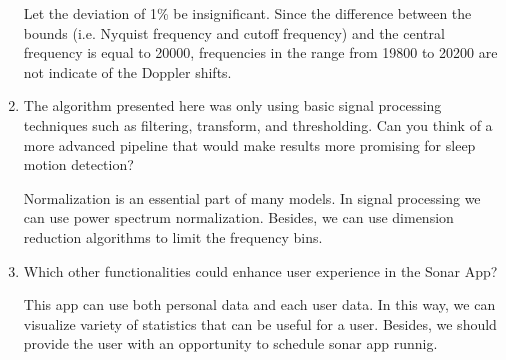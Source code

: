 \documentclass{homework}
\begin{document}
\begin{enumerate}
Let the deviation of 1\% be insignificant. Since the difference between the bounds (i.e. Nyquist frequency and cutoff frequency) and the central frequency is equal to 20000, frequencies in the range from 19800 to 20200 are not indicate of the Doppler shifts.
\newpage
\item The algorithm presented here was only using basic signal processing techniques such as filtering, transform, and thresholding. Can you think of a more advanced pipeline that would make results more promising for sleep motion detection?

Normalization is an essential part of many models. In signal processing we can use power spectrum normalization. Besides, we can use dimension reduction algorithms to limit the frequency bins.

\item Which other functionalities could enhance user experience in the Sonar App?

This app can use both personal data and each user data. In this way, we can visualize variety of statistics that can be useful for a user. Besides, we should provide the user with an opportunity to schedule sonar app runnig.
\end{enumerate}
\end{document}
